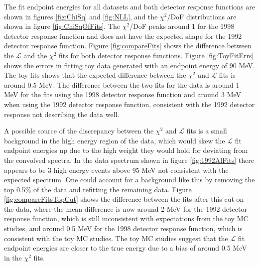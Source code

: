 The fit endpoint energies for all 
datasets and both detector response functions are shown in figures \ref{fig:ChiSq} and \ref{fig:NLL}, and the $\chi^2$/DoF
distributions are shown in figure \ref{fig:ChiSqOfFits}. 
The $\chi^2$/DoF peaks around 1 for the 1998 detector response 
function and does not have the expected shape for the 1992 detector response function. Figure \ref{fig:compareFits}
shows the difference between the $\mathcal{L}$ and the $\chi^2$ fits for both detector response functions.
Figure \ref{fig:ToyFitErrs} shows the errors in fitting toy data generated with
an endpoint energy of 90 MeV. The toy fits shows that the expected difference between the $\chi^2$ and $\mathcal{L}$ fits 
is around 0.5 MeV. The difference between the two fits for the data is around 1 MeV for the fits using the 1998 detector 
response function and around 3 MeV when using the 1992 detector response function, consistent with the 1992 detector response 
not describing the data well. 

A possible source of the discrepancy between the $\chi^2$ and $\mathcal{L}$ fits is a small background 
in the high energy region of the data, which would skew the $\mathcal{L}$ fit endpoint energies up due to the high weight they would hold for deviating
from the convolved spectra. In the data spectrum shown in figure \ref{fig:1992AlFits} there appears to be 3 high energy events above 95 MeV
not consistent with the expected spectrum. One could account for a background like this by removing the top 0.5\% of the data and refitting the remaining
data. Figure \ref{fig:compareFitsTopCut} shows the difference between the fits after this cut on the data, where the 
mean difference is now around 2 MeV for the 1992 detector response function, which is still inconsistent with expectations from
the toy MC studies, and around 0.5 MeV for the 1998 detector response function, which is consistent with the toy MC studies.
The toy MC studies suggest that the $\mathcal{L}$ fit endpoint energies are closer to the true energy due to a bias of around 0.5 MeV 
in the $\chi^2$ fits.



